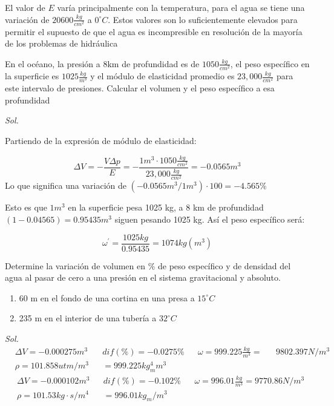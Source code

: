 El valor de $E$ varía principalmente con la temperatura, para el agua se tiene una variación de $20600\frac{kg}{cm^2}$ a $0^{\circ}C$. Estos valores son lo suficientemente elevados para permitir el supuesto de que el agua es incompresible en resolución de la mayoría de los problemas de hidráulica

\begin{example}
    En el océano, la presión a 8km de profundidad es de $1050\frac{kg}{cm^2}$, el peso específico en la superficie es $1025\frac{kg}{m^3}$ y el módulo de elasticidad promedio es $23,000\frac{kg}{cm^2}$ para este intervalo de presiones. Calcular el volumen y el peso específico a esa profundidad
\end{example}

\textit{ Sol. }

Partiendo de la expresión de módulo de elasticidad: 

\begin{equation*}
    \Delta V=-\frac{V\Delta p}{E}=-\frac{1m^3\cdot 1050\frac{kg}{cm^2}}{23,000\frac{kg}{cm^2}}=-0.0565m^3
\end{equation*}
Lo que significa una variación de $(-0.0565m^3/1m^3)\cdot 100=-4.565$\%

Esto es que $1m^3$ en la superficie pesa 1025 kg, a 8 km de profundidad $(1-0.04565)=0.95435m^3$
siguen pesando 1025 kg. Así el peso específico será: 

\begin{equation*}
    \omega^{\prime}=\frac{1025kg}{0.95435}=1074kg(m^3)
\end{equation*}

\begin{problem}
    Determine la variación de volumen en \% de peso específico y de densidad del agua al pasar de cero a una presión en el sistema gravitacional y absoluto.
    \begin{enumerate}
        \item 60 m en el fondo de una cortina en una presa a $15^{\circ}C$
        \item 235 m en el interior de una tubería a $32^{\circ}C$
    \end{enumerate}
\end{problem}

\textit{ Sol. }
\begin{align*}
    &\Delta V=-0.000275m^3&&dif(\%)=-0.0275\%&&\omega=999.225\frac{kg}{m^3}=&&9802.397N/m^3\\
    &\rho=101.858utm/m^3&&=999.225kg_m^4m^3
\end{align*}
\begin{align*}
    &\Delta V=-0.000102m^3&&dif(\%)=-0.102\%&&\omega=996.01\frac{kg}{m^3}=9770.86N/m^3\\
    &\rho=101.53kg\cdot s/m^4&&=996.01kg_m/m^3
\end{align*}

